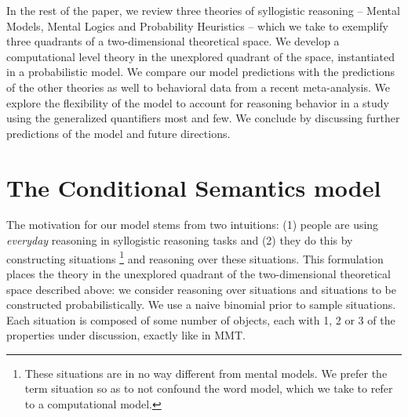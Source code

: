 \documentclass[10pt,letterpaper]{article}
\begin{document}
%
%

In the rest of the paper, we review three theories of syllogistic reasoning -- Mental Models, Mental Logics and Probability Heuristics -- which we take to exemplify three quadrants of a two-dimensional theoretical space. We develop a computational level theory in the unexplored quadrant of the space, instantiated in a probabilistic model. We compare our model predictions with the predictions of the other theories as well to behavioral data from a recent meta-analysis. We explore the flexibility of the model to account for reasoning behavior in a study using the generalized quantifiers most and few. We conclude by discussing further predictions of the model and future directions.  




\section{The Conditional Semantics model}

The motivation for our model stems from two intuitions: (1) people are using \emph{everyday} reasoning in syllogistic reasoning tasks and (2) they do this by constructing situations \footnote{These situations are in no way different from mental models. We prefer the term situation so as to not confound the word model, which we take to refer to a computational model.} and reasoning over these situations. This formulation places the theory in the unexplored quadrant of the two-dimensional theoretical space described above: we consider reasoning over situations and situations to be constructed probabilistically. We use a naive binomial prior to sample situations. Each situation is composed of some number of objects, each with 1, 2 or 3 of the properties under discussion, exactly like in MMT. 
\end{document}

